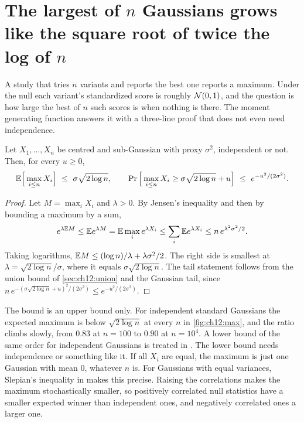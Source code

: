 
\section{The largest of \texorpdfstring{$n$}{n} Gaussians grows like the square root of twice the log of \texorpdfstring{$n$}{n}}\label{sec:ch12:max}

A study that tries $n$ variants and reports the best one reports a maximum. Under the null each variant's standardized score is roughly $\mathcal{N}(0,1)$, and the question is how large the best of $n$ such scores is when nothing is there. The moment generating function answers it with a three-line proof that does not even need independence.

\begin{theorem}\label{thm:ch12:max}
Let $X_1,\dots,X_n$ be centred and sub-Gaussian with proxy $\sigma^2$, independent or not. Then, for every $u\ge0$,
\begin{equation}
\E\Big[\max_{i\le n}X_i\Big]\ \le\ \sigma\sqrt{2\log n},
\qquad
\Pr\Big[\max_{i\le n}X_i\ge\sigma\sqrt{2\log n}+u\Big]\ \le\ e^{-u^2/(2\sigma^2)}.
\label{eq:ch12:max}
\end{equation}
\end{theorem}
\begin{proof}
Let $M=\max_iX_i$ and $\lambda>0$. By Jensen's inequality and then by bounding a maximum by a sum,
\[
e^{\lambda\mathbb{E} M}\le\mathbb{E} e^{\lambda M}=\mathbb{E}\max_ie^{\lambda X_i}\le\sum_i\mathbb{E} e^{\lambda X_i}\le n\,e^{\lambda^2\sigma^2/2}.
\]
Taking logarithms, $\mathbb{E} M\le(\log n)/\lambda+\lambda\sigma^2/2$. The right side is smallest at $\lambda=\sqrt{2\log n}/\sigma$, where it equals $\sigma\sqrt{2\log n}$. The tail statement follows from the union bound of \cref{sec:ch12:union} and the Gaussian tail, since $n\,e^{-(\sigma\sqrt{2\log n}+u)^2/(2\sigma^2)}\le e^{-u^2/(2\sigma^2)}$.
\end{proof}

The bound is an upper bound only. For independent standard Gaussians the expected maximum is below $\sqrt{2\log n}$ at every $n$ in \cref{fig:ch12:max}, and the ratio climbs slowly, from $0.83$ at $n=100$ to $0.90$ at $n=10^4$. A lower bound of the same order for independent Gaussians is treated in \citet{vershynin2018}. The lower bound needs independence or something like it. If all $X_i$ are equal, the maximum is just one Gaussian with mean $0$, whatever $n$ is. For Gaussians with equal variances, Slepian's inequality in \citet{vershynin2018} makes this precise. Raising the correlations makes the maximum stochastically smaller, so positively correlated null statistics have a smaller expected winner than independent ones, and negatively correlated ones a larger one.

